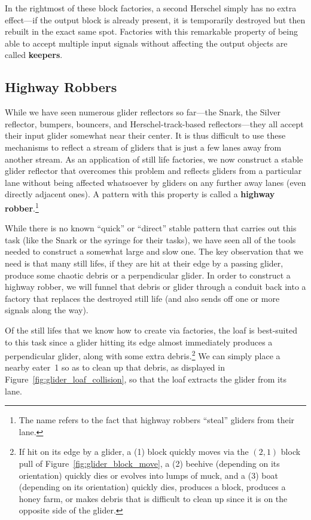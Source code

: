 In the rightmost of these block factories, a second Herschel simply has no extra effect---if the output block is already present, it is temporarily destroyed but then rebuilt in the exact same spot. Factories with this remarkable property of being able to accept multiple input signals without affecting the output objects are called \textbf{keepers}.


\subsection{Highway Robbers}\label{sec:highway_robber}

While we have seen numerous glider reflectors so far---the Snark, the Silver reflector, bumpers, bouncers, and Herschel-track-based reflectors---they all accept their input glider somewhat near their center. It is thus difficult to use these mechanisms to reflect a stream of gliders that is just a few lanes away from another stream. As an application of still life factories, we now construct a stable glider reflector that overcomes this problem and reflects gliders from a particular lane without being affected whatsoever by gliders on any further away lanes (even directly adjacent ones). A pattern with this property is called a \textbf{highway robber}.\footnote{The name refers to the fact that highway robbers ``steal'' gliders from their lane.}

While there is no known ``quick'' or ``direct'' stable pattern that carries out this task (like the Snark or the syringe for their tasks), we have seen all of the tools needed to construct a somewhat large and slow one. The key observation that we need is that many still lifes, if they are hit at their edge by a passing glider, produce some chaotic debris or a perpendicular glider. In order to construct a highway robber, we will funnel that debris or glider through a conduit back into a factory that replaces the destroyed still life (and also sends off one or more signals along the way).

Of the still lifes that we know how to create via factories, the loaf is best-suited to this task since a glider hitting its edge almost immediately produces a perpendicular glider, along with some extra debris.\footnote{If hit on its edge by a glider, a (1) block quickly moves via the $(2,1)$ block pull of Figure~\ref{fig:glider_block_move}, a (2) beehive (depending on its orientation) quickly dies or evolves into lumps of muck, and a (3) boat (depending on its orientation) quickly dies, produces a block, produces a honey farm, or makes debris that is difficult to clean up since it is on the opposite side of the glider.} We can simply place a nearby eater~1 so as to clean up that debris, as displayed in Figure~\ref{fig:glider_loaf_collision}, so that the loaf extracts the glider from its lane.

